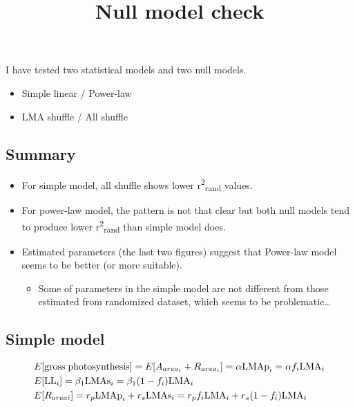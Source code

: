 \documentclass[12pt,]{article}
\title{Null model check}
\author{}
\date{}
\providecommand{\tightlist}{%
  \setlength{\itemsep}{0pt}\setlength{\parskip}{0pt}}
\begin{document}
\maketitle

I have tested two statistical models and two null models.

\begin{itemize}
\tightlist
\item
  Simple linear / Power-law
\item
  LMA shuffle / All shuffle
\end{itemize}

\subsection{Summary}\label{summary}

\begin{itemize}
\tightlist
\item
  For simple model, all shuffle shows lower
  r\textsuperscript{2}\textsubscript{rand} values.
\item
  For power-law model, the pattern is not that clear but both null
  models tend to produce lower r\textsuperscript{2}\textsubscript{rand}
  than simple model does.
\item
  Estimated parameters (the last two figures) suggest that Power-law
  model seems to be better (or more suitable).

  \begin{itemize}
  \tightlist
  \item
    Some of parameters in the simple model are not different from those
    estimated from randomized dataset, which seems to be
    problematic\ldots{}
  \end{itemize}
\end{itemize}

\subsection{Simple model}\label{simple-model}

\begin{align}
  &E[{\rm gross \; photosynthesis}]
  = E[A_{area_i} + R_{area_i}]
  = \alpha{\rm LMAp}_{i}
  = \alpha f_{i} {\rm LMA}_{i} \label{eq:E-AR}\\
  &E[{\rm LL}_{i}] = \beta_{1} {\rm LMAs}_{i}
  = \beta_{1} (1 - f_{i}) {\rm LMA}_{i} \label{eq:E-LL}\\
  &E[R_{areai}] = r_{p}{\rm LMAp}_{i} + r_{s} {\rm LMAs}_{i}
  = r_{p} f_{i} {\rm LMA}_{i} + r_{s} (1 - f_{i}) {\rm LMA}_{i}
  \label{eq:E-R}
\end{align}
\end{document}
